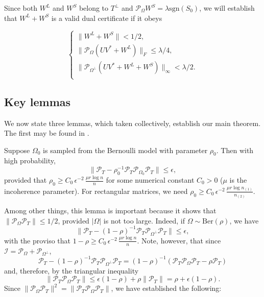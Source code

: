 Since both $W^L$ and $W^S$ belong to $T^\perp$ and $\mathcal{P}_{\Omega} W^S = \lambda
\textrm{sgn}(S_0)$, we will establish that $W^L + W^S$ is a valid dual certificate if it obeys

\begin{equation}
\label{eq:dual-certif-use}
\begin{cases}
  \|W^L + W^S\| < 1/2,\\
  \|\mathcal{P}_{\Omega}(UV^* + W^L)\|_F \le \lambda/4,\\
  \|\mathcal{P}_{\Omega^\perp}(UV^* + W^L + W^S)\|_\infty < \lambda/2.\\
\end{cases}
\end{equation}

\subsection{Key lemmas}
\label{sec:keys}

We now state three lemmas, which taken collectively, establish our main theorem. The first may be found in \cite{CR08}.

\begin{theorem}\cite[Theorem 4.1]{CR08}
  \label{teo:rudelson} 
  Suppose $\Omega_0$ is sampled from the Bernoulli model with parameter $\rho_0$. Then with high probability,
  \begin{equation}
    \label{eq:rudelson} 
    \|\mathcal{P}_T - \rho_0^{-1} \mathcal{P}_T \mathcal{P}_{\Omega_0} \mathcal{P}_T \| \le \epsilon,  
  \end{equation}
  provided that $\rho_0 \ge C_0 \, \epsilon^{-2} \, \frac{\mu r \log
    n}{n}$ for some numerical constant $C_0 > 0$ ($\mu$ is the incoherence parameter). For rectangular matrices, we need $\rho_0
  \ge C_0 \, \epsilon^{-2} \, \frac{\mu r \log n_{(1)}}{n_{(2)}}$. 
\end{theorem}

Among other things, this lemma is important because it shows that
$\|\mathcal{P}_{\Omega}\mathcal{P}_T\| \le 1/2$, provided $|\Omega|$ is not too large. Indeed, if
$\Omega \sim \text{Ber}(\rho)$, we have
\[
\|\mathcal{P}_T - (1-\rho)^{-1} \mathcal{P}_T \mathcal{P}_{\Omega^\perp} \mathcal{P}_T\| \le \epsilon,  
\] 
with the proviso that $1-\rho \ge C_0 \, \epsilon^{-2} \, \frac{\mu r \log
  n}{n}$. Note, however, that since $\mathcal{I} = \mathcal{P}_{\Omega} + \mathcal{P}_{\Omega^\perp}$, 
\[
\mathcal{P}_T - (1-\rho)^{-1} \mathcal{P}_T \mathcal{P}_{\Omega^\perp} \mathcal{P}_T = (1-\rho)^{-1}(\mathcal{P}_T \mathcal{P}_{\Omega} \mathcal{P}_T - \rho\mathcal{P}_T)
\]
and, therefore, by the triangular inequality
\[
\|\mathcal{P}_T \mathcal{P}_{\Omega} \mathcal{P}_T\| \le \epsilon(1-\rho) + \rho \|\mathcal{P}_T\| = \rho +
\epsilon(1-\rho). 
\]
Since $\|\mathcal{P}_{\Omega}\mathcal{P}_T\|^2 = \|\mathcal{P}_T\mathcal{P}_{\Omega}\mathcal{P}_T\|$, we have established the following:

